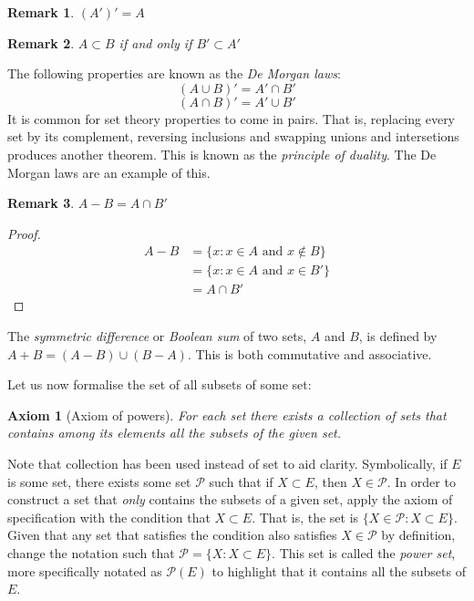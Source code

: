 \documentclass[12pt]{article}
\newtheorem{axiom}{Axiom}
\newtheorem{remark}{Remark}
\begin{document}
\begin{remark}
    $(A')' = A$
\end{remark}

\begin{remark}
    $A \subset B$ if and only if $B' \subset A'$
\end{remark}

The following properties are known as the \textit{De Morgan laws}:
\begin{equation}
    (A \cup B)' = A' \cap B'
\end{equation}
\begin{equation}
    (A \cap B)' = A' \cup B'
\end{equation}
It is common for set theory properties to come in pairs. That is, replacing every set by its complement,
reversing inclusions and swapping unions and intersetions produces another theorem. This is known as the \textit{principle
of duality}. The De Morgan laws are an example of this.

\begin{remark}
    $A - B = A \cap B'$
\end{remark}
\begin{proof}
    \begin{eqnarray*}
        A - B &=\{x: x \in A \text{ and } x \notin B\}\\
              &= \{x: x \in A \text{ and } x \in B'\}\\
              &= A \cap B'
    \end{eqnarray*}
\end{proof}

The \textit{symmetric difference} or \textit{Boolean sum} of two sets, $A$ and $B$, is
defined by $A + B = (A - B) \cup (B - A)$. This is both commutative and associative.

Let us now formalise the set of all subsets of some set:
\begin{axiom}[Axiom of powers]
    For each set there exists a collection of sets that contains among its elements all the subsets
    of the given set.
\end{axiom}
Note that collection has been used instead of set to aid clarity. Symbolically, if $E$ is some set, there
exists some set $\mathcal{P}$ such that if $X \subset E$, then $X \in \mathcal{P}$. In order to construct
a set that \textit{only} contains the subsets of a given set, apply the axiom of specification with the
condition that $X \subset E$. That is, the set is $\{X \in \mathcal{P}: X \subset E\}$. Given that any
set that satisfies the condition also satisfies $X \in \mathcal{P}$ by definition, change the notation
such that $\mathcal{P} = \{X: X \subset E\}$. This set is called the \textit{power set}, more specifically
notated as $\mathcal{P}(E)$ to highlight that it contains all the subsets of $E$.
\end{document}
